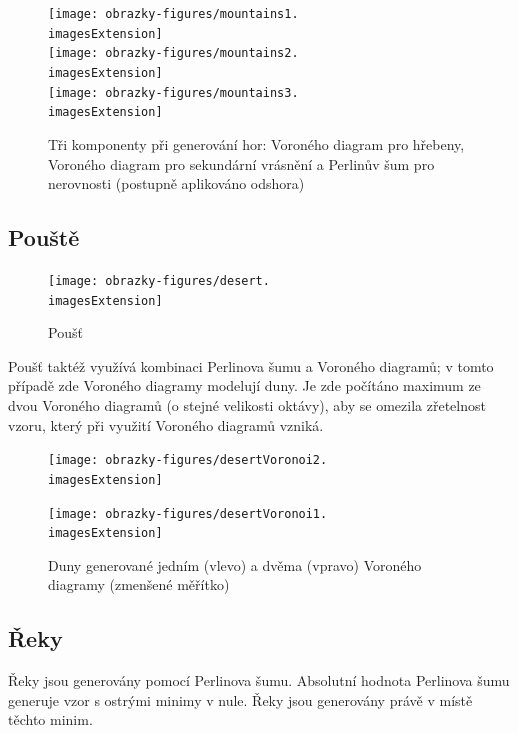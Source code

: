 \begin{figure}[H]
	\centering
	\texttt{[image: obrazky-figures/mountains1.\\imagesExtension]}
	\\ \vspace{1cm}
	\texttt{[image: obrazky-figures/mountains2.\\imagesExtension]}
	\\ \vspace{1cm}
	\texttt{[image: obrazky-figures/mountains3.\\imagesExtension]}
	\caption{Tři komponenty při generování hor: Voroného diagram pro hřebeny, Voroného diagram pro sekundární vrásnění a Perlinův šum pro nerovnosti (postupně aplikováno odshora)}
\end{figure}

\subsection{Pouště}
\begin{figure}[H]
	\texttt{[image: obrazky-figures/desert.\\imagesExtension]}
	\caption{Poušť}
\end{figure}

Poušť taktéž využívá kombinaci Perlinova šumu a Voroného diagramů; v tomto případě zde Voroného diagramy modelují duny. Je zde počítáno maximum ze dvou Voroného diagramů (o stejné velikosti oktávy), aby se omezila zřetelnost vzoru, který při využití Voroného diagramů vzniká.

\begin{figure}[H]
	\centering
	\begin{minipage}[t]{0.49\textwidth}
		\texttt{[image: obrazky-figures/desertVoronoi2.\\imagesExtension]}
	\end{minipage}
	\hfill
	\begin{minipage}[t]{0.49\textwidth}
		\texttt{[image: obrazky-figures/desertVoronoi1.\\imagesExtension]}
	\end{minipage}
	\caption{Duny generované jedním (vlevo) a dvěma (vpravo) Voroného diagramy (zmenšené měřítko)}
\end{figure}

\pagebreak
\subsection{Řeky}
Řeky jsou generovány pomocí Perlinova šumu. Absolutní hodnota Perlinova šumu generuje vzor s ostrými minimy v nule. Řeky jsou generovány právě v místě těchto minim.

